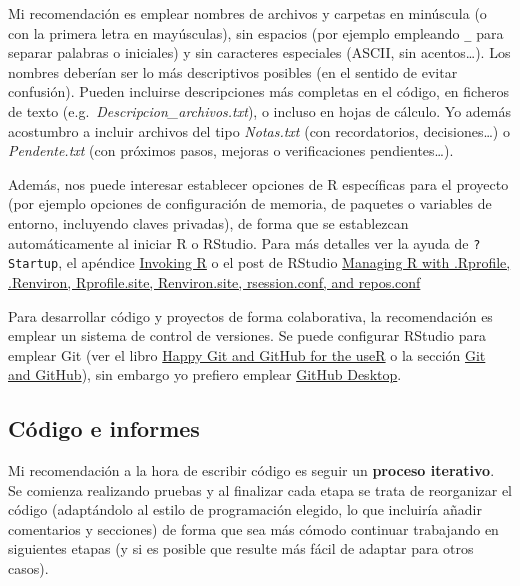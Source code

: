 \documentclass[
]{book}
\theoremstyle{break}
\theoremstyle{nonumberplain}
\begin{document}
Mi recomendación es emplear nombres de archivos y carpetas en minúscula (o con la primera letra en mayúsculas), sin espacios (por ejemplo empleando \texttt{\_} para separar palabras o iniciales) y sin caracteres especiales (ASCII, sin acentos\ldots).
Los nombres deberían ser lo más descriptivos posibles (en el sentido de evitar confusión).
Pueden incluirse descripciones más completas en el código, en ficheros de texto (e.g.~\emph{Descripcion\_archivos.txt}), o incluso en hojas de cálculo.
Yo además acostumbro a incluir archivos del tipo \emph{Notas.txt} (con recordatorios, decisiones\ldots) o \emph{Pendente.txt} (con próximos pasos, mejoras o verificaciones pendientes\ldots).

Además, nos puede interesar establecer opciones de R específicas para el proyecto (por ejemplo opciones de configuración de memoria, de paquetes o variables de entorno, incluyendo claves privadas), de forma que se establezcan automáticamente al iniciar R o RStudio.
Para más detalles ver la ayuda de \texttt{?Startup}, el apéndice \href{https://cran.r-project.org/doc/manuals/r-release/R-intro.html\#Invoking-R}{Invoking R} o el post de RStudio
\href{https://support.posit.co/hc/en-us/articles/360047157094-Managing-R-with-Rprofile-Renviron-Rprofile-site-Renviron-site-rsession-conf-and-repos-conf}{Managing R with .Rprofile, .Renviron, Rprofile.site, Renviron.site, rsession.conf, and repos.conf}

Para desarrollar código y proyectos de forma colaborativa, la recomendación es emplear un sistema de control de versiones.
Se puede configurar RStudio para emplear Git (ver el libro \href{https://happygitwithr.com/index.html}{Happy Git and GitHub for the useR} o la sección \href{https://r-pkgs.org/software-development-practices.html\#sec-sw-dev-practices-git-github}{Git and GitHub}), sin embargo yo prefiero emplear \href{https://desktop.github.com/}{GitHub Desktop}.

\subsection{Código e informes}\label{codigo}

Mi recomendación a la hora de escribir código es seguir un \textbf{proceso iterativo}.
Se comienza realizando pruebas y al finalizar cada etapa se trata de reorganizar el código (adaptándolo al estilo de programación elegido, lo que incluiría añadir comentarios y secciones) de forma que sea más cómodo continuar trabajando en siguientes etapas (y si es posible que resulte más fácil de adaptar para otros casos).
\end{document}
